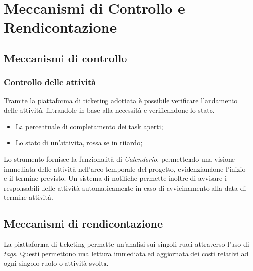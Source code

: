 \section{Meccanismi di Controllo e Rendicontazione}
\subsection{Meccanismi di controllo}
\subsubsection{Controllo delle attività}
Tramite la piattaforma di ticketing adottata è possibile verificare l'andamento delle attività, filtrandole in base alla necessità e verificandone lo stato.
\begin{itemize}
	\item La percentuale di completamento dei task aperti;
	\item Lo stato di un'attivita, rossa se in ritardo;
\end{itemize}
Lo strumento fornisce la funzionalità di \textit{Calendario}, permettendo una visione immediata delle attività nell'arco temporale del progetto, evidenziandone l'inizio e il termine previsto. Un sistema di notifiche permette inoltre di avvisare i responsabili delle attività automaticamente in caso di avvicinamento alla data di termine attività.

\subsection{Meccanismi di rendicontazione}
La piattaforma di ticketing permette un'analisi sui singoli ruoli attraverso l'uso di \textit{tags}. Questi permettono una lettura immediata ed aggiornata dei costi relativi ad ogni singolo ruolo o attività svolta.